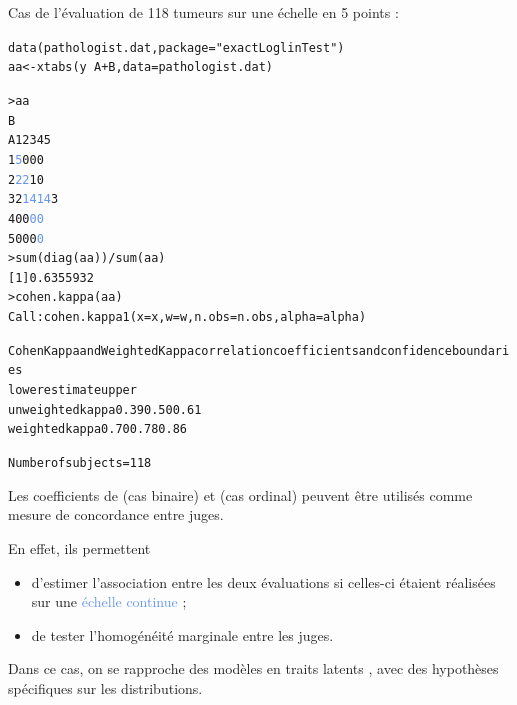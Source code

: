 Cas de l'évaluation de 118 tumeurs sur une échelle en 5 points\autocite{agresti90} :
\begin{alltt}
data(pathologist.dat, package = "exactLoglinTest")
aa <- xtabs(y ~ A + B, data = pathologist.dat)
\end{alltt}
\begin{alltt}\small
> aa
   B
A    1  2  3  4  5
  1   \textcolor{CornflowerBlue}{5}  0  0  0
  2  \textcolor{CornflowerBlue}{2}    \textcolor{CornflowerBlue}{2}  1  0
  3  2 \textcolor{CornflowerBlue}{14}  \textcolor{CornflowerBlue}{14}  3
  4  0  0  \textcolor{CornflowerBlue}{0}    \textcolor{CornflowerBlue}{0}
  5  0  0  0  \textcolor{CornflowerBlue}{0}  
> sum(diag(aa))/sum(aa)  \hfill{}
[1] 0.6355932
> cohen.kappa(aa)
Call: cohen.kappa1(x = x, w = w, n.obs = n.obs, alpha = alpha)

Cohen Kappa and Weighted Kappa correlation coefficients and confidence boundaries
                 lower estimate upper
unweighted kappa  0.39     0.50  0.61
weighted kappa    0.70     0.78  0.86  \hfill{}

 Number of subjects = 118
\end{alltt}



Les coefficients de  (cas binaire) et
 (cas ordinal) peuvent être utilisés comme mesure de
concordance entre juges.

En effet, ils permettent
\begin{itemize}
\item d'estimer l'association entre les deux évaluations si celles-ci étaient
  réalisées sur une \textcolor{CornflowerBlue}{échelle continue} ;
\item de tester l'homogénéité marginale entre les juges.
\end{itemize}
\medskip

Dans ce cas, on se rapproche des modèles en traits latents \autocite{uebersaxA},
avec des hypothèses spécifiques sur les distributions.


